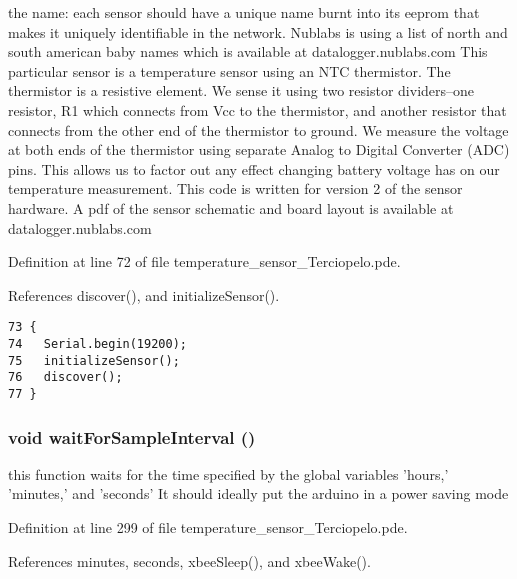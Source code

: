 the name: each sensor should have a unique name burnt into its eeprom that makes it uniquely identifiable in the network. Nublabs is using a list of north and south american baby names which is available at datalogger.nublabs.com This particular sensor is a temperature sensor using an NTC thermistor. The thermistor is a resistive element. We sense it using two resistor dividers--one resistor, R1 which connects from Vcc to the thermistor, and another resistor that connects from the other end of the thermistor to ground. We measure the voltage at both ends of the thermistor using separate Analog to Digital Converter (ADC) pins. This allows us to factor out any effect changing battery voltage has on our temperature measurement. This code is written for version 2 of the sensor hardware. A pdf of the sensor schematic and board layout is available at datalogger.nublabs.com 

Definition at line 72 of file temperature\_\-sensor\_\-Terciopelo.pde.

References discover(), and initializeSensor().

\begin{Code}\begin{verbatim}73 {
74   Serial.begin(19200);
75   initializeSensor();
76   discover();
77 }
\end{verbatim}
\end{Code}


\hypertarget{applet_2temperature__sensor___terciopelo_8pde_b4dbd8380e5d93ead613cf38e6083b7f}{
\subsubsection[{waitForSampleInterval}]{\setlength{\rightskip}{0pt plus 5cm}void waitForSampleInterval ()}}
\label{applet_2temperature__sensor___terciopelo_8pde_b4dbd8380e5d93ead613cf38e6083b7f}


this function waits for the time specified by the global variables 'hours,' 'minutes,' and 'seconds' It should ideally put the arduino in a power saving mode 



Definition at line 299 of file temperature\_\-sensor\_\-Terciopelo.pde.

References minutes, seconds, xbeeSleep(), and xbeeWake().

